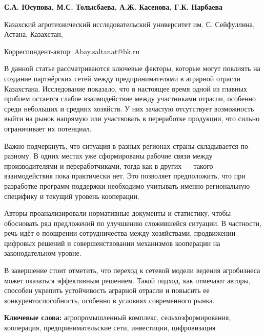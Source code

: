 
\begin{articleheader}

{\bfseries
С.А. Юсупова,
М.С. Толысбаева,
А.Ж. Касенова,
Г.К. Нарбаева
}
\end{articleheader}

\begin{affiliation}
Казахский агротехнический исследовательский университет им. С. Сейфуллина, Астана, Казахстан,

\raggedright \textsuperscript{\envelope }Корреспондент-автор: Abay.saltanat@bk.ru
\end{affiliation}

В данной статье рассматриваются ключевые факторы, которые могут повлиять
на создание партнёрских сетей между предпринимателями в аграрной отрасли
Казахстана. Исследование показало, что в настоящее время одной из
главных проблем остается слабое взаимодействие между участниками
отрасли, особенно среди небольших и средних хозяйств. У них зачастую
отсутствует возможность выйти на рынок напрямую или участвовать в
переработке продукции, что сильно ограничивает их потенциал.

Важно подчеркнуть, что ситуация в разных регионах страны складывается
по-разному. В одних местах уже сформированы рабочие связи между
производителями и переработчиками, тогда как в других --- такого
взаимодействия пока практически нет. Это позволяет предположить, что при
разработке программ поддержки необходимо учитывать именно региональную
специфику и текущий уровень кооперации.

Авторы проанализировали нормативные документы и статистику, чтобы
обосновать ряд предложений по улучшению сложившейся ситуации. В
частности, речь идёт о поощрении сотрудничества между хозяйствами,
продвижении цифровых решений и совершенствовании механизмов кооперации
на законодательном уровне.

В завершение стоит отметить, что переход к сетевой модели ведения
агробизнеса может оказаться эффективным решением. Такой подход, как
отмечают авторы, способен укрепить устойчивость аграрной отрасли и
повысить ее конкурентоспособность, особенно в условиях современного
рынка.

{\bfseries Ключевые слова:} агропромышленный комплекс, сельхозформирования,
кооперация, предпринимательские сети, инвестиции, цифровизация

